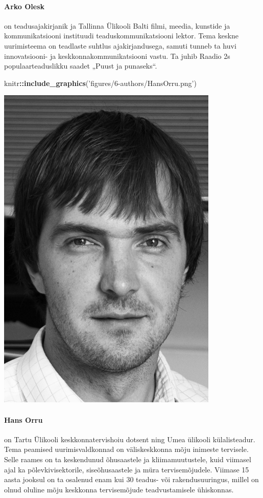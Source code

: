 \documentclass[estonian,]{article}
\newenvironment{Shaded}{\begin{snugshade}}{\end{snugshade}}
\newcommand{\KeywordTok}[1]{\textcolor[rgb]{0.13,0.29,0.53}{\textbf{#1}}}
\newcommand{\NormalTok}[1]{#1}
\newcommand{\OperatorTok}[1]{\textcolor[rgb]{0.81,0.36,0.00}{\textbf{#1}}}
\newcommand{\StringTok}[1]{\textcolor[rgb]{0.31,0.60,0.02}{#1}}
\let\oldparagraph\paragraph
\renewcommand{\paragraph}[1]{\oldparagraph{#1}\mbox{}}
\begin{document}
\hypertarget{arko-olesk}{%
\paragraph{Arko Olesk}\label{arko-olesk}}

on teadusajakirjanik ja Tallinna Ülikooli Balti filmi, meedia, kunstide ja kommunikatsiooni instituudi teaduskommunikatsiooni lektor. Tema keskne uurimisteema on teadlaste suhtlus ajakirjandusega, samuti tunneb ta huvi innovatsiooni- ja keskkonnakommunikatsiooni vastu. Ta juhib Raadio 2s populaarteaduslikku saadet „Puust ja punaseks``.

\begin{Shaded}
\begin{Highlighting}[]
\NormalTok{knitr}\OperatorTok{::}\KeywordTok{include_graphics}\NormalTok{(}\StringTok{'figures/6-authors/HansOrru.png'}\NormalTok{)}
\end{Highlighting}
\end{Shaded}

\begin{flushleft}\includegraphics[width=0.5\linewidth]{figures/6-authors/HansOrru} \end{flushleft}

\hypertarget{hans-orru}{%
\paragraph{Hans Orru}\label{hans-orru}}

on Tartu Ülikooli keskkonnatervishoiu dotsent ning Umea ülikooli külalisteadur. Tema peamised uurimisvaldkonnad on väliskeskkonna mõju inimeste tervisele. Selle raames on ta keskendunud õhusaastele ja kliimamuutustele, kuid viimasel ajal ka põlevkivisektorile, siseõhusaastele ja müra tervisemõjudele. Viimase 15 aasta jooksul on ta osalenud enam kui 30 teadus- või rakendusuuringus, millel on olnud oluline mõju keskkonna tervisemõjude teadvustamisele ühiskonnas.
\end{document}
